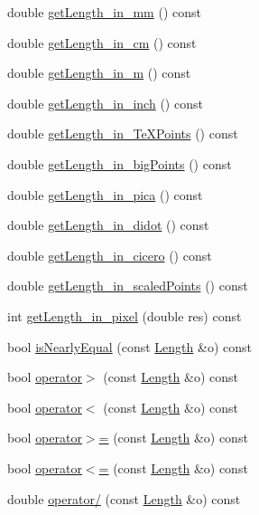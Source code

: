 \begin{DoxyCompactItemize}
double \hyperlink{classLength_ab57252f3b49a668104d76396b2c74041}{get\+Length\+\_\+in\+\_\+mm} () const 
\item 
double \hyperlink{classLength_a988932b7b90b6877fab6cda8b6518ba9}{get\+Length\+\_\+in\+\_\+cm} () const 
\item 
double \hyperlink{classLength_a9e58b6171fb4387892856aee6c13c377}{get\+Length\+\_\+in\+\_\+m} () const 
\item 
double \hyperlink{classLength_afbaef4ba8d8a3e97873ed5cfd20c7dea}{get\+Length\+\_\+in\+\_\+inch} () const 
\item 
double \hyperlink{classLength_a5c2cdbf5cb9c298c7274c146abcadfb2}{get\+Length\+\_\+in\+\_\+\+Te\+X\+Points} () const 
\item 
double \hyperlink{classLength_aa0722753df7a2bf13a0f810271b0dbff}{get\+Length\+\_\+in\+\_\+big\+Points} () const 
\item 
double \hyperlink{classLength_a536fad69aa44f8470987389bca053277}{get\+Length\+\_\+in\+\_\+pica} () const 
\item 
double \hyperlink{classLength_a96904714d67978a6f2b2704d32876e5e}{get\+Length\+\_\+in\+\_\+didot} () const 
\item 
double \hyperlink{classLength_af115dca1feb35b2afadfbdb60961cd50}{get\+Length\+\_\+in\+\_\+cicero} () const 
\item 
double \hyperlink{classLength_a32efa1fa744aed35b06f845f5541a678}{get\+Length\+\_\+in\+\_\+scaled\+Points} () const 
\item 
int \hyperlink{classLength_ad89b728f68aac1d8686a35c21702a241}{get\+Length\+\_\+in\+\_\+pixel} (double res) const 
\item 
bool \hyperlink{classLength_afa380a4e992a003cad9ff14c446ad5fa}{is\+Nearly\+Equal} (const \hyperlink{classLength}{Length} \&o) const 
\item 
bool \hyperlink{classLength_a1781895fc23fbf510fe94939edf1637b}{operator$>$} (const \hyperlink{classLength}{Length} \&o) const 
\item 
bool \hyperlink{classLength_a75db113457eb757a1f25efee9fa73d68}{operator$<$} (const \hyperlink{classLength}{Length} \&o) const 
\item 
bool \hyperlink{classLength_a1c8bc4b8e9f0a9a9eb952f292d27f1e9}{operator$>$=} (const \hyperlink{classLength}{Length} \&o) const 
\item 
bool \hyperlink{classLength_ab4f5431b9feeab02198d4b745a81a8df}{operator$<$=} (const \hyperlink{classLength}{Length} \&o) const 
\item 
double \hyperlink{classLength_a8540d1d5407c5d8b1dd1f76a8e0ed8cb}{operator/} (const \hyperlink{classLength}{Length} \&o) const 

\end{DoxyCompactItemize}
